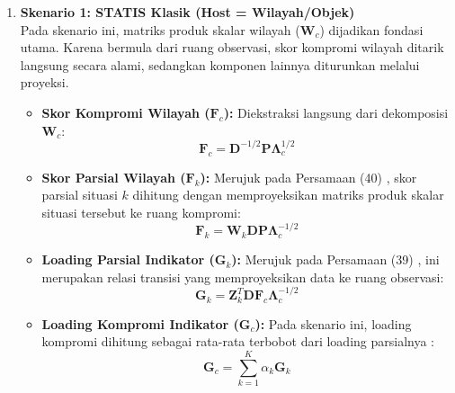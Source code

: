 \begin{enumerate}[label=\arabic*.]
    \item \textbf{Skenario 1: STATIS Klasik (Host = Wilayah/Objek)} \\
    Pada skenario ini, matriks produk skalar wilayah ($\mathbf{W}_c$) dijadikan fondasi utama. Karena bermula dari ruang observasi, skor kompromi wilayah ditarik langsung secara alami, sedangkan komponen lainnya diturunkan melalui proyeksi.
    \begin{itemize}
        \item \textbf{Skor Kompromi Wilayah ($\mathbf{F}_c$):} Diekstraksi langsung dari dekomposisi $\mathbf{W}_c$:
        \begin{equation} \label{eq:skor_kompromi_wilayah}
            \mathbf{F}_c = \mathbf{D}^{-1/2} \mathbf{P} \mathbf{\Lambda}_c^{1/2}
        \end{equation}
        \item \textbf{Skor Parsial Wilayah ($\mathbf{F}_k$):} Merujuk pada Persamaan (40) \citet{abdi2012}, skor parsial situasi $k$ dihitung dengan memproyeksikan matriks produk skalar situasi tersebut ke ruang kompromi:
        \begin{equation} \label{eq:skor_parsial_wilayah}
            \mathbf{F}_k = \mathbf{W}_k \mathbf{D} \mathbf{P} \mathbf{\Lambda}_c^{-1/2}
        \end{equation}
        \item \textbf{Loading Parsial Indikator ($\mathbf{G}_k$):} Merujuk pada Persamaan (39) \citet{abdi2012}, ini merupakan relasi transisi yang memproyeksikan data ke ruang observasi:
        \begin{equation} \label{eq:loading_parsial_indikator}
            \mathbf{G}_k = \mathbf{Z}_k^T \mathbf{D} \mathbf{F}_c \mathbf{\Lambda}_c^{-1/2}
        \end{equation}
        \item \textbf{Loading Kompromi Indikator ($\mathbf{G}_c$):} Pada skenario ini, loading kompromi dihitung sebagai rata-rata terbobot dari loading parsialnya \citep{lavit94}:
        \begin{equation} \label{eq:loading_kompromi_indikator}
            \mathbf{G}_c = \sum_{k=1}^K \alpha_k \mathbf{G}_k
        \end{equation}
    \end{itemize}


\end{enumerate}

